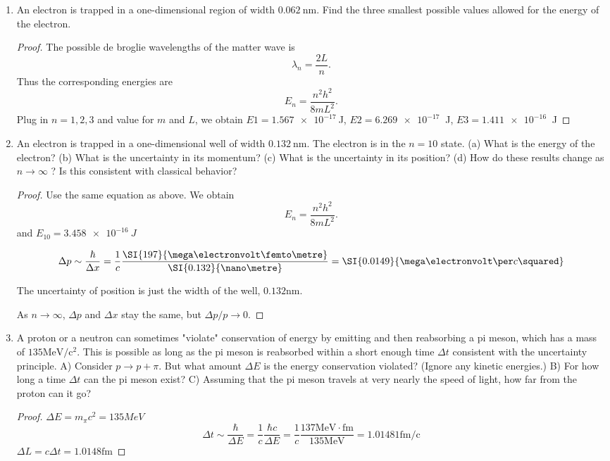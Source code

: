 
\begin{enumerate}
	\item An electron is trapped in a one-dimensional region of width $0.062 \mathrm{~nm}$. Find the three smallest possible values allowed for the energy of the electron. 
\begin{proof}
	The possible de broglie wavelengths of the matter wave is \[
		\lambda_n = \frac{2L}{n}
	.\] 
	Thus the corresponding energies are \[
		E_n = \frac{n^2 h^2}{8 m L^2}
	.\] 
	Plug in $n = 1, 2, 3$ and value for $m$ and $L$, we obtain
	$E1 = \SI{1.567e-17}{} $J, $E2 = \SI{6.269e-17}{}$ J, $E3 = \SI{1.411e-16}{}$ J
\end{proof}


	\item An electron is trapped in a one-dimensional well of width $0.132 \mathrm{~nm}$. The electron is in the $n=10$ state. (a) What is the energy of the electron? (b) What is the uncertainty in its momentum? (c) What is the uncertainty in its position? (d) How do these results change as $n \rightarrow \infty$ ? Is this consistent with classical behavior?
\begin{proof}
	Use the same equation as above. We obtain
\[
		E_n = \frac{n^2 h^2}{8 m L^2}
	.\]
	and $E_{10} = \SI{3.458e-16}{J}$ 

	\[
		\Delta p \sim \frac{\hbar}{\Delta x} = \frac{1}{c} \frac{\SI{197}{\mega\electronvolt \femto\metre}}{\SI{0.132}{\nano\metre}} = \SI{0.0149}{\mega\electronvolt\per c\squared}
	\]

	The uncertainty of position is just the width of the well, $0.132 $nm.

	As $n \to  \infty $, $\Delta p$ and $\Delta x$ stay the same, but $\Delta p / p \to  0$.
\end{proof}


\item A proton or a neutron can sometimes "violate" conservation of energy by emitting and then reabsorbing a pi meson, which has a mass of $135 \mathrm{MeV} / \mathrm{c}^2$. This is possible as long as the pi meson is reabsorbed within a short enough time $\Delta t$ consistent with the uncertainty principle. A) Consider $p \rightarrow p+\pi$. But what amount $\Delta E$ is the energy conservation violated? (Ignore any kinetic energies.) B) For how long a time $\Delta t$ can the pi meson exist? C) Assuming that the pi meson travels at very nearly the speed of light, how far from the proton can it go?
\begin{proof}
	$\Delta E = m_\pi c^2 = 135 MeV$
	\[
		\Delta t \sim \frac{\hbar}{\Delta E}  = \frac{1}{c} \frac{\hbar c}{\Delta E} = \frac{1}{c} \frac{137 \text{MeV} \cdot \text{fm}}{135 \text{MeV}} = 1.01481\text{fm/c}
	\]
	$\Delta L = c \Delta t = 1.0148 \text{fm}$
	\end{proof}
\end{enumerate}
